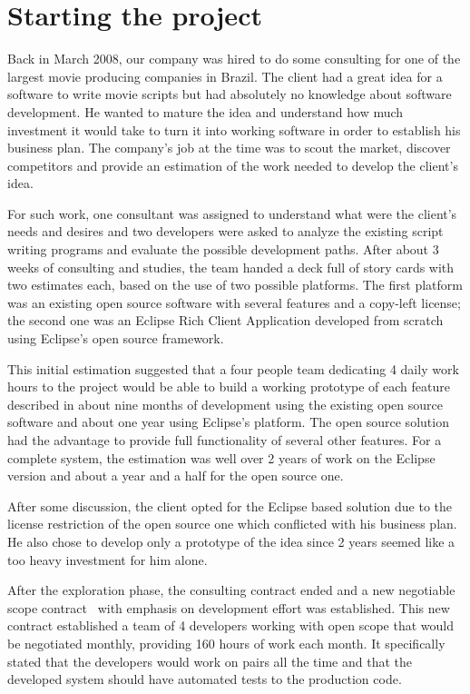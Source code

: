\documentclass[lnbip]{svmultln}
\begin{document}
\section{Starting the project}
\label{sec:start}

Back in March 2008, our company was hired to do some consulting for
one of the largest movie producing companies in Brazil. The client had
a great idea for a software to write movie scripts but had absolutely
no knowledge about software development.  He wanted to mature the idea
and understand how much investment it would take to turn it into
working software in order to establish his business plan. The
company's job at the time was to scout the market, discover
competitors and provide an estimation of the work needed to develop
the client's idea.

For such work, one consultant was assigned to understand what were the
client's needs and desires and two developers were asked to analyze
the existing script writing programs and evaluate the possible
development paths. After about 3 weeks of consulting and studies, the
team handed a deck full of story cards with two estimates each, based
on the use of two possible platforms. The first platform was an
existing open source software with several features and a copy-left
license; the second one was an Eclipse Rich Client Application
developed from scratch using Eclipse's open source framework.

This initial estimation suggested that a four people team dedicating 4
daily work hours to the project would be able to build a working
prototype of each feature described in about nine months of
development using the existing open source software and about one year
using Eclipse's platform. The open source solution had the advantage
to provide full functionality of several other features. For a
complete system, the estimation was well over 2 years of work on the
Eclipse version and about a year and a half for the open source one.

After some discussion, the client opted for the Eclipse based solution
due to the license restriction of the open source one which conflicted
with his business plan. He also chose to develop only a prototype of
the idea since 2 years seemed like a too heavy investment for him
alone.

After the exploration phase, the consulting contract ended and a new
negotiable scope contract~\cite{XP}
with emphasis on development effort was established. This new contract
established a team of 4 developers working with open scope that would
be negotiated monthly, providing 160 hours of work each month. It
specifically stated that the developers would work on pairs all the
time and that the developed system should have automated tests to the
production code.
\end{document}
